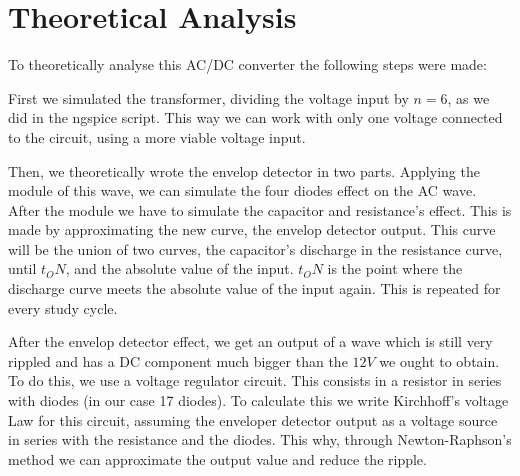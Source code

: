 \section{Theoretical Analysis}
\label{sec:analysis}

To theoretically analyse this AC/DC converter the following steps were made:

First we simulated the transformer, dividing the voltage input by $n=6$, as we did in the ngspice script. This way we can work with only one voltage connected to the circuit, using a more viable voltage input.

Then, we theoretically wrote the envelop detector in two parts. Applying the module of this wave, we can simulate the four diodes effect on the AC wave. After the module we have to simulate the capacitor and resistance's effect. This is made by approximating the new curve, the envelop detector output. This curve will be the union of two curves, the capacitor's discharge in the resistance curve, until $t_ON$, and the absolute value of the input. $t_ON$ is the point where the discharge curve meets the absolute value of the input again. This is repeated for every study cycle.

After the envelop detector effect, we get an output of a wave which is still very rippled and has a DC component much bigger than the $12V$ we ought to obtain.
To do this, we use a voltage regulator circuit. This consists in a resistor in series with diodes (in our case 17 diodes). To calculate this we write Kirchhoff's voltage Law for this circuit, assuming the enveloper detector output as a voltage source in series with the resistance and the diodes. This why, through Newton-Raphson's method we can approximate the output value and reduce the ripple.
